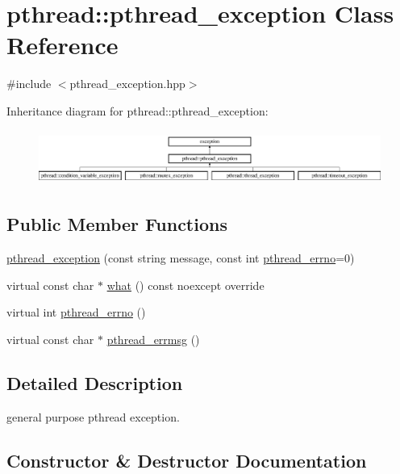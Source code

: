 \hypertarget{classpthread_1_1pthread__exception}{}\section{pthread\+:\+:pthread\+\_\+exception Class Reference}
\label{classpthread_1_1pthread__exception}


{\ttfamily \#include $<$pthread\+\_\+exception.\+hpp$>$}

Inheritance diagram for pthread\+:\+:pthread\+\_\+exception\+:\begin{figure}[H]
\begin{center}
\leavevmode
\includegraphics[height=1.794872cm]{classpthread_1_1pthread__exception}
\end{center}
\end{figure}
\subsection*{Public Member Functions}
\begin{DoxyCompactItemize}
\item 
\hyperlink{classpthread_1_1pthread__exception_a157d4379b6eddcc82ca504534c51abe6}{pthread\+\_\+exception} (const string message, const int \hyperlink{classpthread_1_1pthread__exception_a8a5c22a403ebd14635e912295fe02a1e}{pthread\+\_\+errno}=0)
\item 
virtual const char $\ast$ \hyperlink{classpthread_1_1pthread__exception_a908666a0dd622c9a2a008e89a15d8fc7}{what} () const  noexcept override
\item 
virtual int \hyperlink{classpthread_1_1pthread__exception_a8a5c22a403ebd14635e912295fe02a1e}{pthread\+\_\+errno} ()
\item 
virtual const char $\ast$ \hyperlink{classpthread_1_1pthread__exception_aa2371eb23800817723174186450e9716}{pthread\+\_\+errmsg} ()
\end{DoxyCompactItemize}


\subsection{Detailed Description}
general purpose pthread exception. 

\subsection{Constructor \& Destructor Documentation}
\hypertarget{classpthread_1_1pthread__exception_a157d4379b6eddcc82ca504534c51abe6}{}
